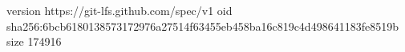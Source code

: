 version https://git-lfs.github.com/spec/v1
oid sha256:6bcb6180138573172976a27514f63455eb458ba16c819c4d498641183fe8519b
size 174916

